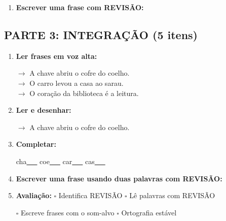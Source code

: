 \begin{exercicio}
\begin{enumerate}[resume]
  \item \textbf{Escrever uma frase com REVISÃO:}
  \begin{center}
  \underline{\hspace{12cm}}
  \end{center}

\end{enumerate}

\subsection*{PARTE 3: INTEGRAÇÃO (5 itens)}

\begin{enumerate}[resume]

  \item \textbf{Ler frases em voz alta:}
  \begin{center}
  $\rightarrow$ A chave abriu o cofre do coelho.\\
  $\rightarrow$ O carro levou a casa ao sarau.\\
  $\rightarrow$ O coração da biblioteca é a leitura.\\
  \end{center}

  \item \textbf{Ler e desenhar:}
  \begin{center}
  $\rightarrow$ A chave abriu o cofre do coelho.
  \end{center}
  \begin{center}
  \end{center}

  \item \textbf{Completar:}
  \begin{center}
  cha\underline{~~~} \quad coe\underline{~~~} \quad car\underline{~~~} \quad cas\underline{~~~}
  \end{center}

  \item \textbf{Escrever uma frase usando duas palavras com REVISÃO:}
  \begin{center}
  \underline{\hspace{12cm}}
  \end{center}

  \item \textbf{Avaliação:} $\square$ Identifica REVISÃO \quad $\square$ Lê palavras com REVISÃO
  \begin{center}
  $\square$ Escreve frases com o som-alvo \quad $\square$ Ortografia estável
  \end{center}


\end{enumerate}
\end{exercicio}
